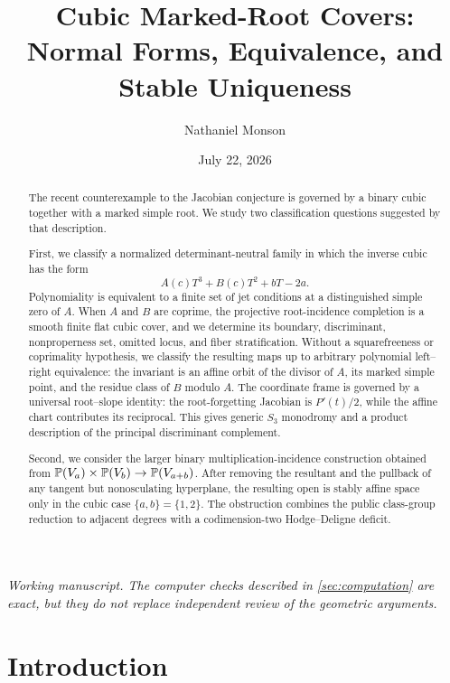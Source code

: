 \documentclass[11pt,reqno]{amsart}
\title[Cubic marked-root covers]{Cubic Marked-Root Covers:\\
Normal Forms, Equivalence, and Stable Uniqueness}
\author{Nathaniel Monson}
\date{July 22, 2026}
\begin{document}
\begin{abstract}
The recent counterexample to the Jacobian conjecture is governed by a binary
cubic together with a marked simple root.  We study two classification
questions suggested by that description.

First, we classify a normalized determinant-neutral family in which the
inverse cubic has the form
\[
 A(c)T^3+B(c)T^2+bT-2a.
\]
Polynomiality is equivalent to a finite set of jet conditions at a
distinguished simple zero of \(A\).  When \(A\) and \(B\) are coprime, the
projective root-incidence completion is a smooth finite flat cubic cover, and
we determine its boundary, discriminant, nonproperness set, omitted locus, and
fiber stratification.  Without a squarefreeness or coprimality hypothesis, we
classify the resulting maps up to arbitrary polynomial left--right
equivalence: the invariant is an affine orbit of the divisor of \(A\), its
marked simple point, and the residue class of \(B\) modulo \(A\).
The coordinate frame is governed by a universal root--slope identity: the
root-forgetting Jacobian is \(P'(t)/2\), while the affine chart contributes
its reciprocal.  This gives generic \(S_3\) monodromy and a product
description of the principal discriminant complement.

Second, we consider the larger binary multiplication-incidence construction
obtained from
\(\mathbb P(V_a)\times\mathbb P(V_b)\to\mathbb P(V_{a+b})\).  After removing the resultant and
the pullback of any tangent but nonosculating hyperplane, the resulting open
is stably affine space only in the cubic case
\(\{a,b\}=\{1,2\}\).  The obstruction combines the public class-group
reduction to adjacent degrees with a codimension-two Hodge--Deligne deficit.
\end{abstract}

\maketitle

\begin{center}
\small\emph{Working manuscript.  The computer checks described in
\cref{sec:computation} are exact, but they do not replace independent review
of the geometric arguments.}
\end{center}

\section{Introduction}
\label{sec:introduction}
\end{document}

